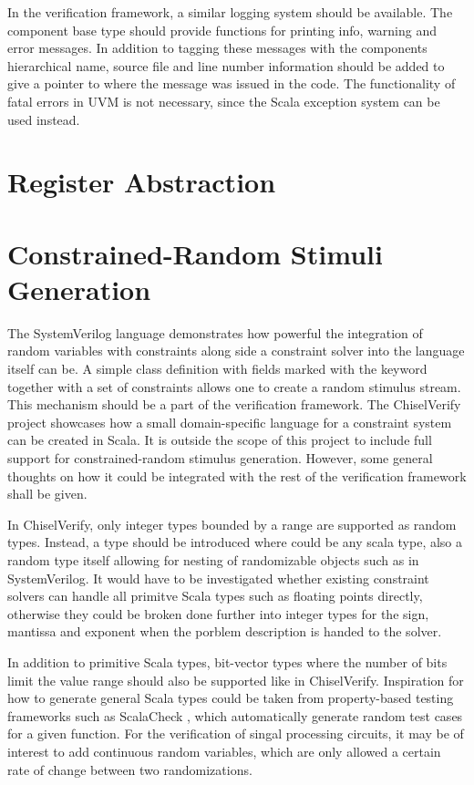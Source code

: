 In the verification framework, a similar logging system should be available. The component base type should provide
functions for printing info, warning and error messages. In addition to tagging these messages with the components
hierarchical name, source file and line number information should be added to give a pointer to where the message was
issued in the code. The functionality of fatal errors in UVM is not necessary, since the Scala exception system can
be used instead.

\section{Register Abstraction} %

\section{Constrained-Random Stimuli Generation} %
\label{sec:crv}

The SystemVerilog language demonstrates how powerful the integration of random variables with constraints along side
a constraint solver into the language itself can be. A simple class definition with fields marked with the 
keyword together with a set of constraints allows one to create a random stimulus stream. This mechanism should be a
part of the verification framework. The ChiselVerify project showcases how a small domain-specific language for a
constraint system can be created in Scala. It is outside the scope of this project to include full support for
constrained-random stimulus generation. However, some general thoughts on how it could be integrated with the rest of
the verification framework shall be given.

In ChiselVerify, only integer types bounded by a range are supported as random types. Instead, a  type
should be introduced where  could be any scala type, also a random type itself allowing for nesting of
randomizable objects such as in SystemVerilog. It would have to be investigated whether existing constraint solvers
can handle all primitve Scala types such as floating points directly, otherwise they could be broken done further
into integer types for the sign, mantissa and exponent when the porblem description is handed to the solver.

In addition to primitive Scala types, bit-vector types where the number of bits limit the value range should also be
supported like in ChiselVerify. Inspiration for how to generate general Scala types could be taken from
property-based testing frameworks such as ScalaCheck \cite{scalacheck}, which automatically generate random test
cases for a given function. For the verification of singal processing circuits, it may be of interest to add
continuous random variables, which are only allowed a certain rate of change between two randomizations.

